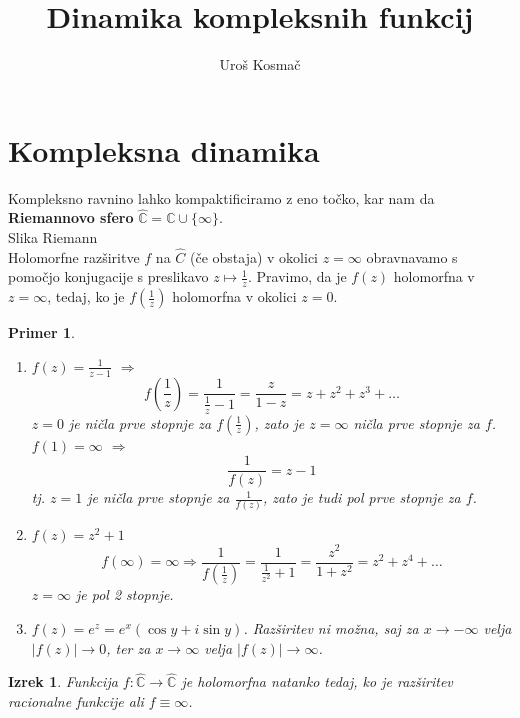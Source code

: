 \documentclass{article}
\title{Dinamika kompleksnih funkcij}
\author{Uroš Kosmač}
\newtheorem{primer}{Primer}
\newtheorem{izrek}{Izrek}
\newcommand{\C}{\mathbb{C}}
\begin{document}
\section{Kompleksna dinamika}

Kompleksno ravnino lahko kompaktificiramo z eno točko, kar nam da \textbf{Riemannovo sfero} $\hat{\C} = \C \cup \{\infty\}$.\\
Slika Riemann \\ 
Holomorfne razširitve $f$ na $\hat{C}$ (če obstaja) v okolici $z = \infty$ obravnavamo s pomočjo konjugacije s preslikavo $z\mapsto \frac{1}{z}$. Pravimo, da je $f(z)$ holomorfna v $z = \infty$, tedaj, ko je $f(\frac{1}{z})$ holomorfna v okolici $z = 0$.

\begin{primer}
\begin{enumerate}
\item[i)] $f(z) = \frac{1}{z - 1}$ $\Longrightarrow$ 
$$
f(\frac{1}{z}) = \frac{1}{\frac{1}{z} -1} = \frac{z}{1 - z} = z + z^2 + z^3 + \dots
$$
$z = 0$ je ničla prve stopnje za $f(\frac{1}{z})$, zato je $z = \infty$ ničla prve stopnje za $f$.\\ 
$f(1) = \infty$ $\Longrightarrow$
$$
\frac{1}{f(z)} = z - 1
$$
tj. $z = 1$ je ničla prve stopnje za $\frac{1}{f(z)}$, zato je tudi pol prve stopnje za $f$.
\item[ii)] $f(z) = z^2 + 1$
$$
f(\infty) = \infty \Longrightarrow \frac{1}{f(\frac{1}{z})} = \frac{1}{\frac{1}{z^2} + 1} = \frac{z^2}{1 + z^2} = z^2 + z^4 + \dots
$$
$z = \infty$ je pol 2 stopnje.
\item[iii)] $f(z) = e^z = e^x(\cos{y} + i\sin{y})$. Razširitev ni možna, saj za $x \rightarrow -\infty$ velja $|f(z)| \rightarrow 0$, ter za $x\rightarrow \infty$ velja $|f(z)| \rightarrow \infty$.
\end{enumerate}
\end{primer}

\begin{izrek}
Funkcija $f: \hat{\C} \rightarrow \hat{\C}$ je holomorfna natanko tedaj, ko je razširitev racionalne funkcije ali $f \equiv \infty$.
\end{izrek}
\end{document}
